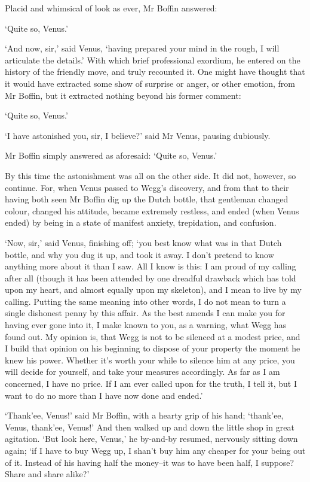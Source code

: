 Placid and whimsical of look as ever, Mr Boffin answered:

‘Quite so, Venus.’

‘And now, sir,’ said Venus, ‘having prepared your mind in the rough, I
will articulate the details.’ With which brief professional exordium, he
entered on the history of the friendly move, and truly recounted it. One
might have thought that it would have extracted some show of surprise or
anger, or other emotion, from Mr Boffin, but it extracted nothing beyond
his former comment:

‘Quite so, Venus.’

‘I have astonished you, sir, I believe?’ said Mr Venus, pausing
dubiously.

Mr Boffin simply answered as aforesaid: ‘Quite so, Venus.’

By this time the astonishment was all on the other side. It did not,
however, so continue. For, when Venus passed to Wegg’s discovery, and
from that to their having both seen Mr Boffin dig up the Dutch bottle,
that gentleman changed colour, changed his attitude, became extremely
restless, and ended (when Venus ended) by being in a state of manifest
anxiety, trepidation, and confusion.

‘Now, sir,’ said Venus, finishing off; ‘you best know what was in that
Dutch bottle, and why you dug it up, and took it away. I don’t pretend
to know anything more about it than I saw. All I know is this: I am
proud of my calling after all (though it has been attended by one
dreadful drawback which has told upon my heart, and almost equally upon
my skeleton), and I mean to live by my calling. Putting the same meaning
into other words, I do not mean to turn a single dishonest penny by this
affair. As the best amends I can make you for having ever gone into it,
I make known to you, as a warning, what Wegg has found out. My opinion
is, that Wegg is not to be silenced at a modest price, and I build that
opinion on his beginning to dispose of your property the moment he knew
his power. Whether it’s worth your while to silence him at any price,
you will decide for yourself, and take your measures accordingly. As
far as I am concerned, I have no price. If I am ever called upon for
the truth, I tell it, but I want to do no more than I have now done and
ended.’

‘Thank’ee, Venus!’ said Mr Boffin, with a hearty grip of his hand;
‘thank’ee, Venus, thank’ee, Venus!’ And then walked up and down the
little shop in great agitation. ‘But look here, Venus,’ he by-and-by
resumed, nervously sitting down again; ‘if I have to buy Wegg up, I
shan’t buy him any cheaper for your being out of it. Instead of his
having half the money--it was to have been half, I suppose? Share and
share alike?’

